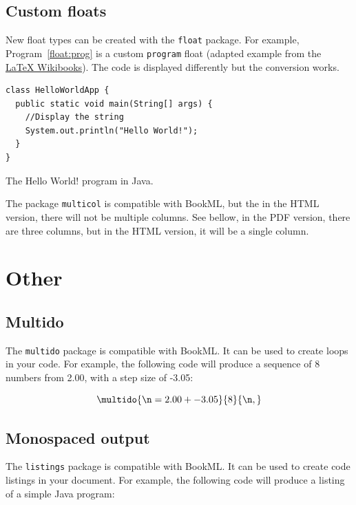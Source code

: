 \subsection{Custom floats}
\label{float:custom}

New float types can be created with the \texttt{float} package. For example, Program~\ref{float:prog} is a custom \texttt{program} float (adapted example from the \href{https://en.wikibooks.org/wiki/LaTeX/Floats,_Figures_and_Captions}{LaTeX Wikibooks}). The code is displayed differently but the conversion works.

\begin{program}
  \begin{verbatim}
class HelloWorldApp {
  public static void main(String[] args) {
    //Display the string
    System.out.println("Hello World!");
  }
}
\end{verbatim}
  \caption{The Hello World! program in Java.}
  \label{float:prog}
\end{program}


The package \texttt{multicol} is compatible with BookML, but the in the HTML version, there will not be multiple columns. See bellow, in the PDF version, there are three columns, but in the HTML version, it will be a single column.
\begin{multicols}{3}
     \lipsum[1-2]
\end{multicols}

\section{Other}
\subsection{Multido}
\label{demo:multido}
The \texttt{multido} package is compatible with BookML. It can be used to create loops in your code. For example, the following code will produce a sequence of 8 numbers from 2.00, with a step size of -3.05:

$$
\multido{\n=2.00+-3.05}{8}{\n, }
$$

\subsection{Monospaced output}
\label{demo:code}
The \texttt{listings} package is compatible with BookML. It can be used to create code listings in your document. For example, the following code will produce a listing of a simple Java program:


